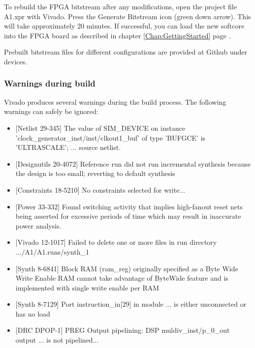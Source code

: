 \documentclass[11pt,a4paper,oneside,openright]{report}
\newcommand{\vv}{ \vspace{2mm} }   %
\begin{document}
To rebuild the FPGA bitstream after any modifications, open the project file 
A1.xpr with Vivado. Press the Generate Bitstream icon (green down arrow). This will take approximately 20 minutes. If successful, you can load the new softcore into the FPGA board as described in chapter \ref{Chap:GettingStarted} page \pageref{Chap:GettingStarted}.
\vv

Prebuilt bitstream files for different configurations are provided at Github under devices.
\vv

\subsubsection{Warnings during build}
Vivado produces several warnings during the build process. The following warnings can safely be ignored:
\vv

\begin{itemize}
\item {}[Netlist 29-345] The value of SIM\_DEVICE on instance 'clock\_generator\_inst/inst/clkout1\_buf' of type 'BUFGCE' is 'ULTRASCALE'; ... source netlist. 

\item {}[Designutils 20-4072] Reference run did not run incremental synthesis because the design is too small; reverting to default synthesis

\item {}[Constraints 18-5210] No constraints selected for write...

\item {}[Power 33-332] Found switching activity that implies high-fanout reset nets being asserted for excessive periods of time which may result in inaccurate power analysis.

\item {}[Vivado 12-1017] Failed to delete one or more files in run directory .../A1/A1.runs/synth\_1

\item {}[Synth 8-6841] Block RAM (ram\_reg) originally specified as a Byte Wide Write Enable RAM cannot take advantage of ByteWide feature and is implemented with single write enable per RAM

\item {}[Synth 8-7129] Port instruction\_in[29] in module ... is either unconnected or has no load

\item {}[DRC DPOP-1] PREG Output pipelining: DSP muldiv\_inst/p\_0\_out output ... is not pipelined...

\end{itemize}
\vv
\end{document}
